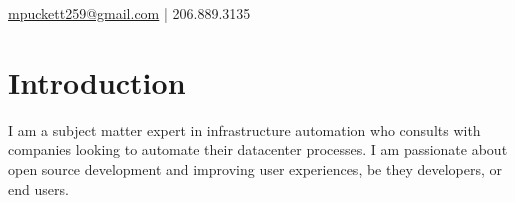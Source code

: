 \documentclass[letterpaper]{deedy-resume-openfont} %
\begin{document}


{
\href{mailto:mpuckett259@gmail.com}{mpuckett259@gmail.com} | 206.889.3135

\noindent\makebox[\linewidth]{\rule{\paperwidth}{0.4pt}}
\section{Introduction}
\begin{flushleft}
I am a subject matter expert in infrastructure automation who consults with companies looking to automate their datacenter processes. I am passionate about open source development and improving user experiences, be they developers, or end users.
\end{flushleft}
\vspace{-10pt}
}

\end{document}
